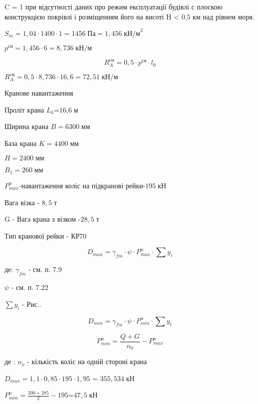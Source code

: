 \documentclass[a4paper,14pt]{article}
\begin{document}
C = 1 при відсутності даних про режим експлуатації будівлі с плоскою конструкцією покрівлі і розміщенням його на висоті H < ${\textit{0,5}}$ км над рівнем моря.

$S_m=1,04\cdot 1400\cdot 1=1456\;\textit{Па}=1,456\;{\textit{кН/м}}^2$

$p^{\textit{сн}}=1,456\cdot 6=8,736\;\textit{кН/м}$

\begin{equation}
    R^{\textit{cн}}_A=0,5\cdot p^{\textit{сн}}\cdot l_0
\end{equation}

$R^{\textit{cн}}_A=0,5\cdot 8,736 \cdot 16,6 = 72,51\;\textit{кН/м}$

Кранове навантаження

Проліт крана $L_k$=$\textit{16,6}\;\textit{м}$

Ширина крана $B=6300\;\textit{мм}$

База крана $K=4400\;\textit{мм}$

$H=2400\;\textit{мм}$

$B_1=260\;\textit{мм}$

$P^n_{max}$-навантаження коліс на підкранові рейки-$195\;\textit{кН}$

Вага візка - $8,5\;\textit{т}$

G - Вага крана з візком -$28,5\;\textit{т}$

Тип кранової рейки - КР70



\begin{equation}
    D_{max}=\gamma_{fm}\cdot \psi \cdot P^n_{max} \cdot \sum y_i
\end{equation}

де: $\gamma_{fm}$ - см. п. 7.9 %

$\psi$ - см. п. 7.22 %

$\sum y_i$ - Рис..

\begin{equation}
    D_{min}=\gamma_{fm}\cdot \psi \cdot P^n_{min} \cdot \sum y_i
\end{equation}

\begin{equation}
P^n_{min} = \frac {Q+G}{n_0}-P^n_{max}
\end{equation}

де : $n_o$ - кількість коліс на одній стороні крана

$D_{max}=1,1\cdot 0,85 \cdot 195 \cdot 1,95$ = $355,534\;\textit{кН}$

$P^n_{min} = \frac {200+285}{2}-195$=$47,5\;\textit{кН}$
\end{document}
